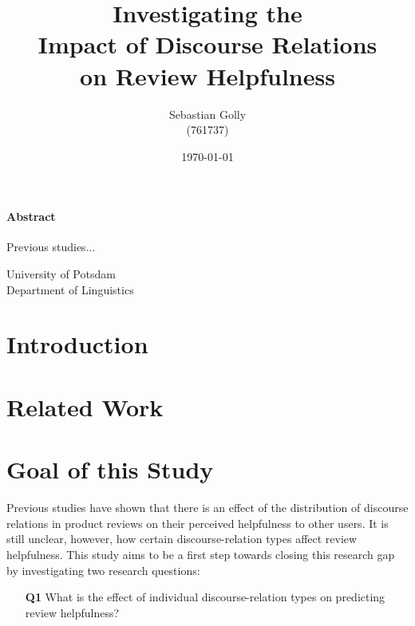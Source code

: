 \documentclass[
    a4paper,%
    12pt,%
    oneside,%
    toc=bibliography,
    final,
]{scrartcl}
\title{Investigating the \\Impact of Discourse Relations\\ on Review Helpfulness}
\subtitle{}
\author{Sebastian Golly\\ {\normalsize (761737)}}
\date{\today}
\begin{document}
\maketitle

\vfill

\paragraph{Abstract}

Previous studies...
\\[3em]

\vfill

\begin{center}
University of Potsdam\\[1.5em]
Department of Linguistics
\end{center}

\thispagestyle{empty}
\newpage


\section{Introduction}



\section{Related Work}
\label{sec:related-work}



\section{Goal of this Study}
\label{sec:goal}

Previous studies have shown that there is an effect of the distribution of discourse relations in product reviews on their perceived helpfulness to other users. It is still unclear, however, how certain discourse-relation types affect review helpfulness. This study aims to be a first step towards closing this research gap by investigating two research questions:

\begin{enumerate}[rightmargin=1cm]
\item[\textbf{Q1}] What is the effect of individual discourse-relation types on predicting review helpfulness?
\end{enumerate}
\end{document}
